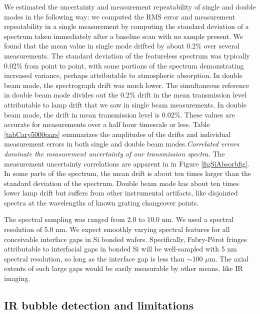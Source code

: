 \documentclass[osajnl,preprint,showpacs,superscriptaddress,12pt]{revtex4-1} %
\begin{document}
We estimated the uncertainty and measurement repeatability of single and double modes in the following way: we computed the RMS error and measurement repeatability in a single measurement by computing the standard deviation of a spectrum taken immediately after a baseline scan with no sample present.  We found that the mean value in single mode drifted by about 0.2\% over several measurements.  The standard deviation of the featureless spectrum was typically 0.02\% from point to point, with some portions of the spectrum demonstrating increased variance, perhaps attributable to atmospheric absorption.  In double beam mode, the spectrograph drift was much lower.  The simultaneous reference in double beam mode divides out the 0.2\% drift in the mean transmission level attributable to lamp drift that we saw in single beam measurements.  In double beam mode, the drift in mean transmission level is 0.02\%.  These values are accurate for measurements over a half hour timescale or less.  Table \ref{tabCary5000pars} summarizes the amplitudes of the drifts and individual measurement errors in both single and double beam modes.\emph{Correlated errors dominate the measurement uncertainty of our transmission spectra.}  The measurement uncertainty correlations are apparent in in Figure \ref{figSiAbsorbfig}.  In some parts of the spectrum, the mean drift is about ten times larger than the standard deviation of the spectrum.  Double beam mode has about ten times lower lamp drift but suffers from other instrumental artifacts, like disjointed spectra at the wavelengths of known grating changeover points.

The spectral sampling was ranged from 2.0 to 10.0 nm.  We used a spectral resolution of 5.0 nm.  We expect smoothly varying spectral features for all conceivable interface gaps in Si bonded wafers.  Specifically, Fabry-P\`erot fringes attributable to interfacial gaps in bonded Si will be well-sampled with 5 nm spectral resolution, so long as the interface gap is less than $\sim$100 $\mu$m.  The axial extents of such large gaps would be easily measurable by other means, like IR imaging.




\subsection{IR bubble detection and limitations}
\end{document}

